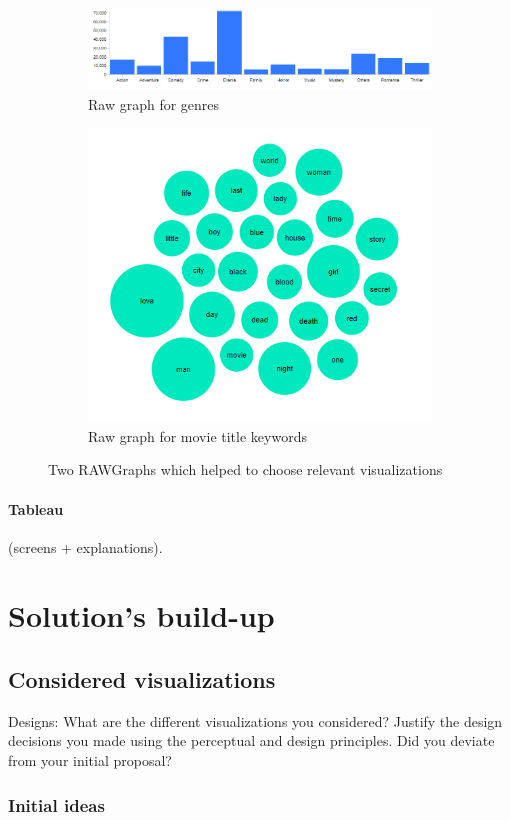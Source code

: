 \documentclass[a4paper,10pt]{article}
\begin{document}
\begin{figure}[ht]
 \begin{subfigure}{1\textwidth}
  \centering
  \includegraphics[height=0.22\linewidth]{images/drafts/rawgraphs-genres.png}
  \caption{Raw graph for genres} \label{fig:rawgraphs-genres}
 \end{subfigure}\hfill
 \begin{subfigure}{1\textwidth}
  \centering
  \includegraphics[height=0.35\linewidth]{images/drafts/rawgraphs-words.png}
  \caption{Raw graph for movie title keywords} \label{fig:rawgraphs-keywords}
 \end{subfigure}
 \caption{Two RAWGraphs which helped to choose relevant visualizations}
\end{figure}

\paragraph{Tableau} (screens + explanations).

\section{Solution's build-up}

\subsection{Considered visualizations}

Designs: What are the different visualizations you considered? Justify the design decisions you made using the perceptual and design principles.
Did you deviate from your initial proposal?

\subsubsection{Initial ideas}
\end{document}
